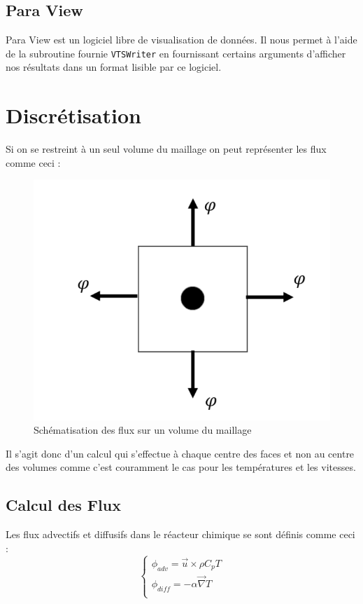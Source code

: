 \documentclass[a4paper,oneside]{article}
\makeatletter
\def\bigcenter{\trivlist \bigcentering\item\relax}
\def\bigcentering{\let\\\@centercr\rightskip\@bigflushglue%
\leftskip\@bigflushglue
\parindent\z@\parfillskip\z@skip}
\makeatother
\begin{document}
\subsection{Para View}

Para View est un logiciel libre de visualisation de données. 
Il nous permet à l'aide de la subroutine fournie \verb?VTSWriter? en fournissant certains arguments d'afficher nos résultats dans un format lisible par ce logiciel.

\section{Discrétisation}
Si on se restreint à un seul volume du maillage on peut représenter les flux comme ceci :

\begin{figure}[h!]
\bigcenter
\includegraphics[scale=0.4]{flux.PNG}
\caption{Schématisation des flux sur un volume du maillage}
\end{figure}


Il s'agit donc d'un calcul qui s'effectue à chaque centre des faces et non au centre des volumes comme c'est couramment le cas pour les températures et les vitesses.


\subsection{Calcul des Flux}


Les flux advectifs et diffusifs dans le réacteur chimique se sont définis comme ceci :
\begin{equation*}
\begin{cases}
\phi_{adv} = \overrightarrow{u}\times \rho C_p T\\
\phi_{diff} = -\alpha \overrightarrow{\nabla} T\\
\end{cases}
\end{equation*}
\end{document}
